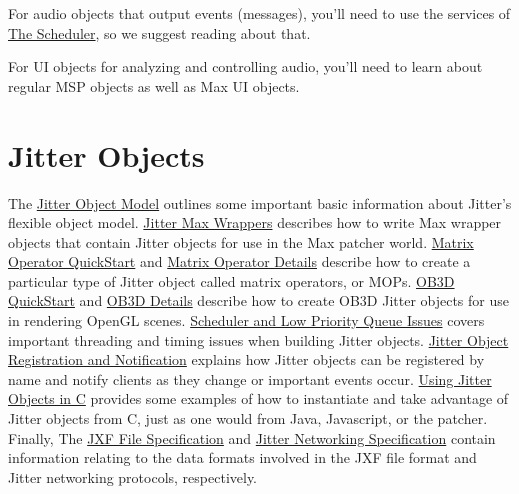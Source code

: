 For audio objects that output events (messages), you'll need to use the services of \hyperlink{chapter_scheduler}{The Scheduler}, so we suggest reading about that.

For UI objects for analyzing and controlling audio, you'll need to learn about regular MSP objects as well as Max UI objects.\hypertarget{main_chapter_roadmap_jit_objects}{}\section{Jitter Objects}\label{main_chapter_roadmap_jit_objects}
The \hyperlink{chapter_jit_objectmodel}{Jitter Object Model} outlines some important basic information about Jitter's flexible object model. \hyperlink{chapter_jit_maxwrappers}{Jitter Max Wrappers} describes how to write Max wrapper objects that contain Jitter objects for use in the Max patcher world. \hyperlink{chapter_jit_mopqs}{Matrix Operator QuickStart} and \hyperlink{chapter_jit_mopdetails}{Matrix Operator Details} describe how to create a particular type of Jitter object called matrix operators, or MOPs. \hyperlink{chapter_jit_ob3dqs}{OB3D QuickStart} and \hyperlink{chapter_jit_ob3ddetails}{OB3D Details} describe how to create OB3D Jitter objects for use in rendering OpenGL scenes. \hyperlink{chapter_jit_sched}{Scheduler and Low Priority Queue Issues} covers important threading and timing issues when building Jitter objects. \hyperlink{chapter_jit_notification}{Jitter Object Registration and Notification} explains how Jitter objects can be registered by name and notify clients as they change or important events occur. \hyperlink{chapter_jit_usingobjs}{Using Jitter Objects in C} provides some examples of how to instantiate and take advantage of Jitter objects from C, just as one would from Java, Javascript, or the patcher. Finally, The \hyperlink{chapter_jit_jxf}{JXF File Specification} and \hyperlink{chapter_jit_networking}{Jitter Networking Specification} contain information relating to the data formats involved in the JXF file format and Jitter networking protocols, respectively. 